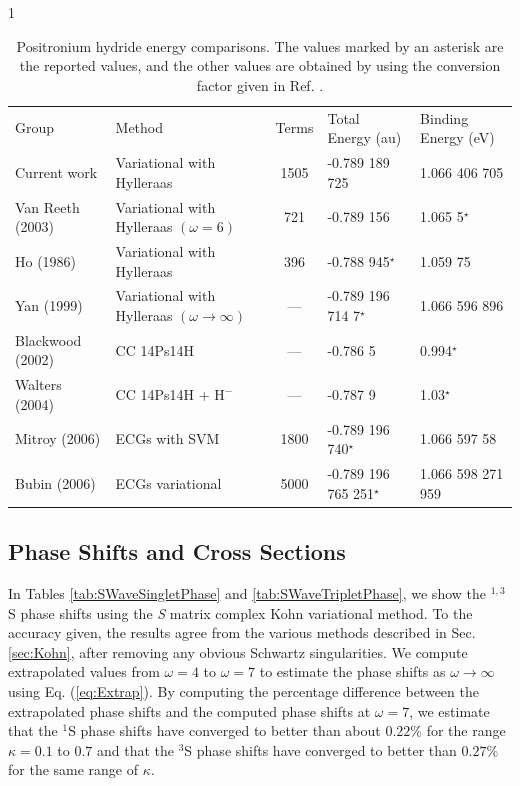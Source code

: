 \documentclass[preprint,showpacs,preprintnumbers,amsmath,amssymb,longbibliography,pra,aps]{revtex4-1}
\begin{document}
\squeezetable  %
\begin{table}[H]
\begin{center}1
\begin{ruledtabular}  %
\begin{tabular}{l l c l l}
Group & Method & Terms & Total Energy (au) & Binding Energy (eV)\\
\colrule
Current work & Variational with Hylleraas & 1505 & -0.789 189 725 & 1.066 406 705 \\
Van Reeth (2003) \cite{VanReeth2003} & Variational with Hylleraas $(\omega = 6)$ & 721 & -0.789 156 & 1.065 5$^\star$ \\
Ho (1986) \cite{Ho1986} & Variational with Hylleraas & 396 & -0.788 945$^\star$ & 1.059 75 \\
Yan (1999) \cite{Yan1999} & Variational with Hylleraas $(\omega \rightarrow \infty)$ & --- & -0.789 196 714 7$^\star$ & 1.066 596 896 \\
Blackwood (2002) \cite{Blackwood2002} & CC 14Ps14H & --- & -0.786 5 & 0.994$^\star$ \\
Walters (2004) \cite{Walters2004} & CC 14Ps14H + $\text{H}^-$ & --- & -0.787 9 & 1.03$^\star$\\
Mitroy (2006) \cite{Mitroy2006} & ECGs with SVM & 1800 & -0.789 196 740$^\star$ & 1.066 597 58 \\
Bubin (2006) \cite{Bubin2006} & ECGs variational & 5000 & -0.789 196 765 251$^\star$ & 1.066 598 271 959 \\
\end{tabular}
\end{ruledtabular}
\caption{Positronium hydride energy comparisons. The values marked by an asterisk are the reported values, and the other values are obtained by using the conversion factor given in Ref. \cite{Mohr2012,*NISTConversions}.}
\label{tab:BoundEnergy}
\end{center}
\end{table}

\subsection{Phase Shifts and Cross Sections}

In Tables \ref{tab:SWaveSingletPhase} and \ref{tab:SWaveTripletPhase}, we show the $^{1,3}$S phase shifts using the \emph{S} matrix complex Kohn variational method. To the accuracy given, the results agree from the various methods described in Sec. \ref{sec:Kohn}, after removing any obvious Schwartz singularities. We compute extrapolated values from $\omega = 4$ to $\omega = 7$ to estimate the phase shifts as $\omega \rightarrow \infty$ using Eq. (\ref{eq:Extrap}). By computing the percentage difference between the extrapolated phase shifts and the computed phase shifts at $\omega=7$, we estimate that the $^1$S phase shifts have converged to better than about $0.22\%$ for the range $\kappa=0.1$ to $0.7$ and that the $^3$S phase shifts have converged to better than $0.27\%$ for the same range of $\kappa$.
\end{document}
